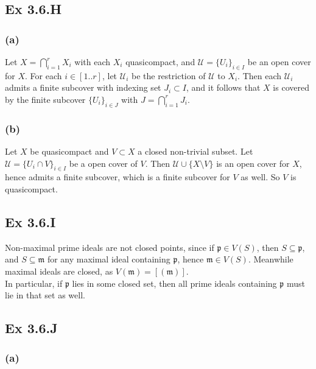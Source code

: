 \documentclass{article}
\theoremstyle{definition}
\begin{document}
\subsection*{Ex 3.6.H}

\subsubsection*{(a)}

Let $X = \bigcap_{i = 1}^{r} X_i$ with each $X_i$ quasicompact, and
$\mathcal{U} = \{U_i\}_{i \in I}$ be an open cover for $X$. For each $i \in
	[1..r]$, let $\mathcal{U}_i$ be the restriction of $\mathcal{U}$ to $X_i$. Then
each $\mathcal{U}_i$ admits a finite subcover with indexing set $J_i \subset
	I$, and it follows that $X$ is covered by the finite subcover $\{U_i\}_{i \in
	J}$ with $J = \bigcap_{i = 1}^{r} J_i$.

\subsubsection*{(b)}

Let $X$ be quasicompact and $V \subset X$ a closed non-trivial subset. Let
$\mathcal{U} = \{U_i \cap V\}_{i \in I}$ be a open cover of $V$. Then
$\mathcal{U} \cup \{X \setminus V\}$ is an open cover for $X$, hence admits a
finite subcover, which is a finite subcover for $V$ as well. So $V$ is
quasicompact.

\subsection*{Ex 3.6.I}

Non-maximal prime ideals are not closed points, since if $\mathfrak{p} \in
	V(S)$, then $S \subseteq \mathfrak{p}$, and $S \subseteq \mathfrak{m}$ for any
maximal ideal containing $\mathfrak{p}$, hence $\mathfrak{m} \in V(S)$.
Meanwhile maximal ideals are closed, as $V(\mathfrak{m}) = [(\mathfrak{m})]$. \\

In particular, if $\mathfrak{p}$ lies in some closed set, then all prime ideals
containing $\mathfrak{p}$ must lie in that set as well.

\subsection*{Ex 3.6.J}

\subsubsection*{(a)}
\end{document}
